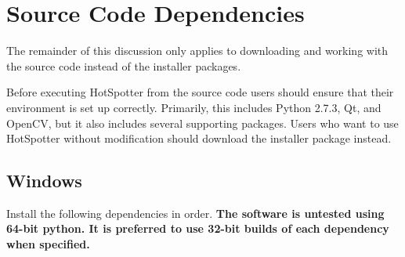 \documentclass[a4paper,10pt]{article}
\begin{document}
\section{Source Code Dependencies}

The remainder of this discussion only applies to downloading and
working with the source code instead of the installer packages.

Before executing HotSpotter from the source code users should ensure
that their environment is set up correctly. Primarily, this includes
Python 2.7.3, Qt, and OpenCV, but it also includes several supporting
packages.  Users who want to use HotSpotter without modification
should download the installer package instead.

    \subsection{Windows}
        Install the following dependencies in order.  
        \textbf{The software is untested using 64-bit python. It is preferred to use 32-bit builds of each dependency when specified.}
\end{document}
